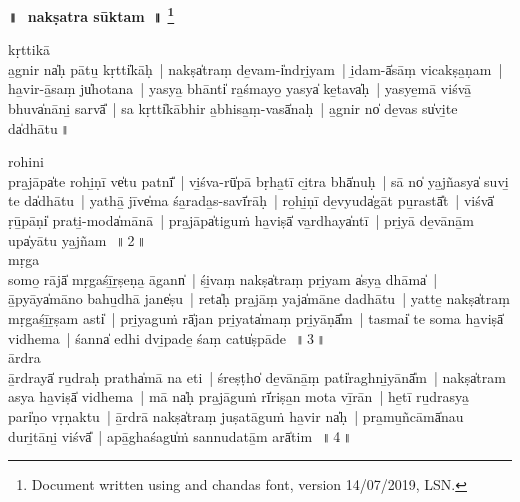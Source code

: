 \documentclass[parskip, DIV=14]{scrartcl}
\renewcommand{\thefootnote}{\fnsymbol{footnote}} %
\begin{document}

\vspace{-1.5cm}

\begin{center}
\textbf{{\Huge॥\,~nakṣatra sūktam~॥  \LARGE\let\thefootnote\relax\footnote{\color{lightgray} Document written using \XeLaTeX{} and chandas font,  version 14/07/2019, LSN.}}}
\end{center}
\Large

{%

\vspace{0.5cm}

\Large
\vspace{1.5cm}

kṛttikā \\
a̱gnir na̍ḥ pātu̱ kṛtti̍kāḥ~|  nakṣa̍traṃ de̱vam-i̍ndri̱yam~|  i̱dam-ā̍sāṃ vicakṣa̱ṇam~|  ha̱vir-ā̱saṃ ju̍hotana~|  yasya̱ bhānti̍ ra̱śmayo̱ yasya̍ ke̱tava̍ḥ~|  yasye̱mā viśvā̱ bhuva̍nāni̱ sarvā̎~|  sa kṛtti̍kābhir a̱bhisa̱ṃ-vasā̍naḥ~|  a̱gnir no̍ de̱vas su̍vi̱te da̍dhātu\,॥ \\
\vspace{0.5cm}

rohini \\ 
pra̱jāpa̍te rohi̱ṇī ve̍tu patnī̎~|  vi̱śva-rū̍pā bṛha̱tī ci̱tra bhā̍nuḥ~|  sā no̍ ya̱jñasya̍ suvi̱ te da̍dhātu~|  yathā̱ jīve̍ma śa̱rada̱s-savī̍rāḥ~|  ro̱hi̱ṇī de̱vyuda̍gāt pu̱rastā̎t~|  viśvā̍ ṛū̱pāṇi̍ prati̱-moda̍mānā~|  pra̱jāpa̍tiguṁ ha̱viṣā̍ va̱rdhaya̍ntī~|  pri̱yā de̱vānā̱m upa̍yātu ya̱jñam~\,॥\,2\,॥ \\

mṛga \\ 
somo̱ rājā̍ mṛgaśī̱ṟṣeṇa̱ āgann̍~|  śi̱vaṃ nakṣa̍traṃ pri̱yam a̍sya̱ dhāma̍~|  ā̱pyāya̍māno bahu̱dhā jane̍ṣu~|  reta̍ḥ pra̱jāṃ yaja̍māne dadhātu~|  yatte̱ nakṣa̍traṃ mṛgaśī̱ṟṣam asti̍~|  pri̱yaguṁ rā̍jan pri̱yata̍maṃ pri̱yāṇā̎m~|  tasmai̍ te soma ha̱viṣā̍ vidhema~|  śanna̍ edhi dvi̱pade̱ śaṃ catu̍ṣpāde~\,॥\,3\,॥ \\

ārdra \\ 
ā̱rdrayā̍ ru̱draḥ pratha̍mā na eti~|  śreṣṭho̍ de̱vānā̱ṃ pati̍raghni̱yānā̎m~|  nakṣa̍tram asya ha̱viṣā̍ vidhema~|  mā na̍ḥ pra̱jāguṁ rī̍riṣa̱n mota vī̱rān~|  he̱tī ru̱drasya̱ pari̍ṇo vṛṇaktu~|  ā̱rdrā nakṣa̍traṃ juṣatāguṁ ha̱vir na̍ḥ~|  pra̱mu̱ñcāmā̍nau duri̱tāni̱ viśvā̎~|  apā̱ghaśagu̍ṁ sannudatā̱m arā̍tim~\,॥\,4\,॥ \\

}
\end{document}
